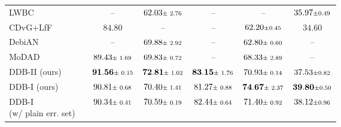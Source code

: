 {\begin{tabular}{lcccccc}
		LWBC \small{\cite{NEURIPS2022_75004615_LWBC}}                            &    \textcolor{green}{\tick}     &                         --                         &       $62.03 \text{\scriptsize{$\pm$ 2.76}}$       &                         --                         &                         --                         &       $35.97 \text{\scriptsize{$\pm $0.49}}$       \\
		CDvG+LfF \small{\cite{jung2023fighting}}                                 &    \textcolor{green}{\tick}     &                      $84.80$                       &                         --                         &                         --                         &       $62.20 \text{\scriptsize{$\pm $0.45}}$       &                      $34.60 $                      \\
		DebiAN \small{\cite{li2022discover}}                                     &    \textcolor{green}{\tick}     &                         --                         &       $69.88 \text{\scriptsize{$\pm$ 2.92}}$       &                         --                         &       $62.80 \text{\scriptsize{$\pm$ 0.60}}$       &                         --                         \\
		MoDAD \small{\cite{pastore2024lookingmodeldebiasinglens}}                &    \textcolor{green}{\tick}     &       $89.43 \text{\scriptsize{$\pm$ 1.69}}$       &       $69.83 \text{\scriptsize{$\pm$ 0.72}}$       &                         --                         &       $68.33 \text{\scriptsize{$\pm$ 2.89}}$       &                         --                         \\ \midrule
		DDB-II (ours)                                                            &    \textcolor{green}{\tick}     &     $\bf 91.56 \text{\scriptsize{$\pm$ 0.15}}$     &     $\bf 72.81 \text{\scriptsize{$\pm$ 1.02}}$     & $\bf 83.15 \text{\scriptsize{$\pm$ 1.76}}$ &       $70.93 \text{\scriptsize{$\pm$ 0.14}}$       &       $37.53 \text{\scriptsize{$\pm $0.82}}$       \\
		DDB-I  (ours)                                                            &    \textcolor{green}{\tick}     & \underline{$90.81 \text{\scriptsize{$\pm$ 0.68}}$} &       $70.40 \text{\scriptsize{$\pm$ 1.41}}$       &       $81.27 \text{\scriptsize{$\pm$ 0.88}}$       &     $\bf 74.67 \text{\scriptsize{$\pm$ 2.37}}$     &     $\bf 39.80 \text{\scriptsize{$\pm $0.50}}$     \\ \midrule
		\parbox{0.35\linewidth}{\raggedright DDB-I \newline (w/ plain err. set)} &    \textcolor{green}{\tick}     &       $90.34 \text{\scriptsize{$\pm$ 0.41}}$       & \underline{$70.59 \text{\scriptsize{$\pm$ 0.19}}$} &       \underline{$82.44 \text{\scriptsize{$\pm$ 0.64}}$}       &       $71.40 \text{\scriptsize{$\pm$ 0.92}}$       & \underline{$38.12 \text{\scriptsize{$\pm $0.96}}$} \\ \bottomrule
	\end{tabular}
}
